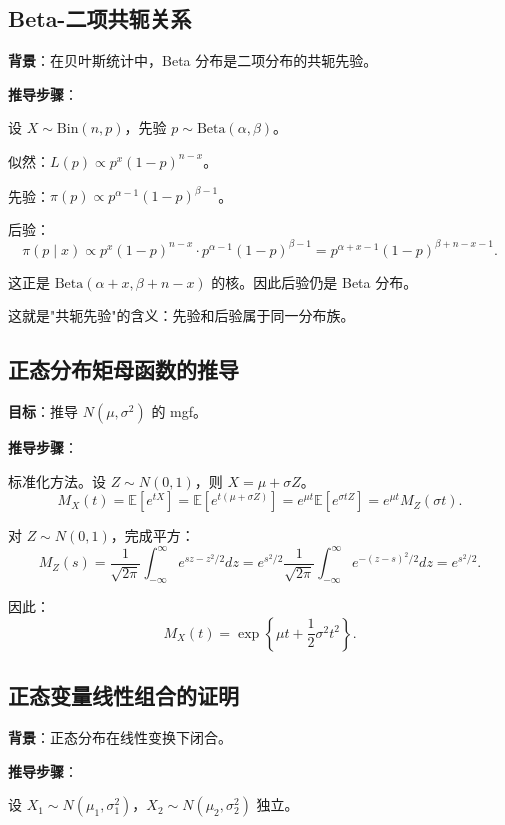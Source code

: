 \subsection{Beta-二项共轭关系}\label{sec:beta-binomial-conjugate}

\textbf{背景}：在贝叶斯统计中，Beta 分布是二项分布的共轭先验。

\textbf{推导步骤}：

设 $X \sim \text{Bin}(n, p)$，先验 $p \sim \text{Beta}(\alpha, \beta)$。

似然：$L(p) \propto p^{x}(1-p)^{n-x}$。

先验：$\pi(p) \propto p^{\alpha-1}(1-p)^{\beta-1}$。

后验：
\[
\pi(p \mid x) \propto p^{x}(1-p)^{n-x} \cdot p^{\alpha-1}(1-p)^{\beta-1} = p^{\alpha+x-1}(1-p)^{\beta+n-x-1}.
\]

这正是 $\text{Beta}(\alpha+x, \beta+n-x)$ 的核。因此后验仍是 Beta 分布。

这就是"共轭先验"的含义：先验和后验属于同一分布族。

\subsection{正态分布矩母函数的推导}\label{sec:derivation-normal-mgf}

\textbf{目标}：推导 $N(\mu, \sigma^{2})$ 的 mgf。

\textbf{推导步骤}：

标准化方法。设 $Z \sim N(0,1)$，则 $X = \mu + \sigma Z$。
\[
M_X(t) = \mathbb{E}[e^{tX}] = \mathbb{E}[e^{t(\mu+\sigma Z)}] = e^{\mu t} \mathbb{E}[e^{\sigma t Z}] = e^{\mu t} M_Z(\sigma t).
\]

对 $Z \sim N(0,1)$，完成平方：
\[
M_Z(s) = \frac{1}{\sqrt{2\pi}} \int_{-\infty}^{\infty} e^{sz - z^{2}/2} dz = e^{s^{2}/2} \frac{1}{\sqrt{2\pi}} \int_{-\infty}^{\infty} e^{-(z-s)^{2}/2} dz = e^{s^{2}/2}.
\]

因此：
\[
M_X(t) = \exp\left\{\mu t + \frac{1}{2}\sigma^{2}t^{2}\right\}.
\]

\subsection{正态变量线性组合的证明}\label{sec:derivation-normal-linear-combination}

\textbf{背景}：正态分布在线性变换下闭合。

\textbf{推导步骤}：

设 $X_1 \sim N(\mu_1, \sigma_1^{2})$，$X_2 \sim N(\mu_2, \sigma_2^{2})$ 独立。

